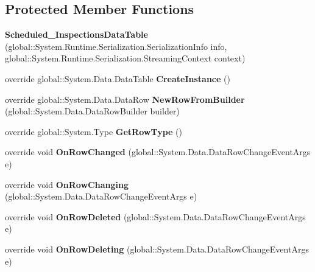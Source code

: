 \subsection*{Protected Member Functions}
\begin{DoxyCompactItemize}
\item 
\mbox{\label{class_a_f_h___scheduler_1_1_home_inspection_data_set_1_1_scheduled___inspections_data_table_a5b4c58d4da0140c870f9a6fc24468de6}} 
{\bfseries Scheduled\+\_\+\+Inspections\+Data\+Table} (global\+::\+System.\+Runtime.\+Serialization.\+Serialization\+Info info, global\+::\+System.\+Runtime.\+Serialization.\+Streaming\+Context context)
\item 
\mbox{\label{class_a_f_h___scheduler_1_1_home_inspection_data_set_1_1_scheduled___inspections_data_table_a6c9b396e9f75ea7e17fe6045d99a52d2}} 
override global\+::\+System.\+Data.\+Data\+Table {\bfseries Create\+Instance} ()
\item 
\mbox{\label{class_a_f_h___scheduler_1_1_home_inspection_data_set_1_1_scheduled___inspections_data_table_a22ed358eab54b83e05bec198da2e985e}} 
override global\+::\+System.\+Data.\+Data\+Row {\bfseries New\+Row\+From\+Builder} (global\+::\+System.\+Data.\+Data\+Row\+Builder builder)
\item 
\mbox{\label{class_a_f_h___scheduler_1_1_home_inspection_data_set_1_1_scheduled___inspections_data_table_a18f11d0461cee23669b024d4ed86a8a9}} 
override global\+::\+System.\+Type {\bfseries Get\+Row\+Type} ()
\item 
\mbox{\label{class_a_f_h___scheduler_1_1_home_inspection_data_set_1_1_scheduled___inspections_data_table_a24686ac864b26fdc3767eafb774ebf69}} 
override void {\bfseries On\+Row\+Changed} (global\+::\+System.\+Data.\+Data\+Row\+Change\+Event\+Args e)
\item 
\mbox{\label{class_a_f_h___scheduler_1_1_home_inspection_data_set_1_1_scheduled___inspections_data_table_acef6d13cd7be9f0d1e4c0c051b2fcca2}} 
override void {\bfseries On\+Row\+Changing} (global\+::\+System.\+Data.\+Data\+Row\+Change\+Event\+Args e)
\item 
\mbox{\label{class_a_f_h___scheduler_1_1_home_inspection_data_set_1_1_scheduled___inspections_data_table_ab9420e9c0c9f488ef8cfd2d9e3e5abcb}} 
override void {\bfseries On\+Row\+Deleted} (global\+::\+System.\+Data.\+Data\+Row\+Change\+Event\+Args e)
\item 
\mbox{\label{class_a_f_h___scheduler_1_1_home_inspection_data_set_1_1_scheduled___inspections_data_table_ae29d3d8fbea1a9b30eb257e11ac41e4a}} 
override void {\bfseries On\+Row\+Deleting} (global\+::\+System.\+Data.\+Data\+Row\+Change\+Event\+Args e)
\end{DoxyCompactItemize}
